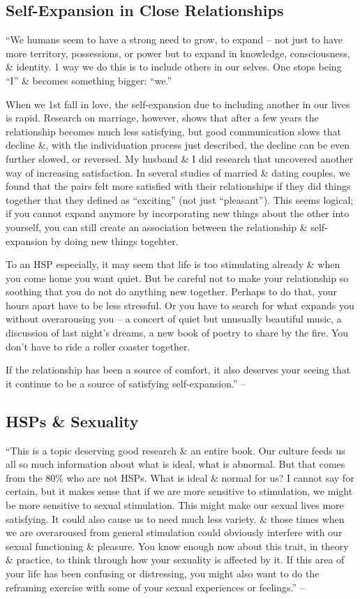 \documentclass{article}
\numberwithin{equation}{section}
\begin{document}
\subsection{Self-Expansion in Close Relationships}
``We humans seem to have a strong need to grow, to expand -- not just to have more territory, possessions, or power but to expand in knowledge, consciousness, \& identity. 1 way we do this is to include others in our selves. One stops being ``I'' \& becomes something bigger: ``we.''

When we 1st fall in love, the self-expansion due to including another in our lives is rapid. Research on marriage, however, shows that after a few years the relationship becomes much less satisfying, but good communication slows that decline \&, with the individuation process just described, the decline can be even further slowed, or reversed. My husband \& I did research that uncovered another way of increasing satisfaction. In several studies of married \& dating couples, we found that the pairs felt more satisfied with their relationships if they did things together that they defined as ``exciting'' (not just ``pleasant''). This seems logical; if you cannot expand anymore by incorporating new things about the other into yourself, you can still create an association between the relationship \& self-expansion by doing new things togehter.

To an HSP especially, it may seem that life is too stimulating already \& when you come home you want quiet. But be careful not to make your relationship so soothing that you do not do anything new together. Perhaps to do that, your hours apart have to be less stressful. Or you have to search for what expands you without overarousing you -- a concert of quiet but unusually beautiful music, a discussion of last night's dreams, a new book of poetry to share by the fire. You don't have to ride a roller coaster together.

If the relationship has been a source of comfort, it also deserves your seeing that it continue to be a source of satisfying self-expansion.'' -- \cite[pp. 193--194]{Aron2013}

\subsection{HSPs \& Sexuality}
``This is a topic deserving good research \& an entire book. Our culture feeds us all so much information about what is ideal, what is abnormal. But that comes from the 80\% who are not HSPs. What is ideal \& normal for us? I cannot say for certain, but it makes sense that if we are more sensitive to stimulation, we might be more sensitive to sexual stimulation. This might make our sexual lives more satisfying. It could also cause us to need much less variety. \& those times when we are overaroused from general stimulation could obviously interfere with our sexual functioning \& pleasure. You know enough now about this trait, in theory \& practice, to think through how your sexuality is affected by it. If this area of your life has been confusing or distressing, you might also want to do the reframing exercise with some of your sexual experiences or feelings.'' -- \cite[pp. 194--195]{Aron2013}
\end{document}
